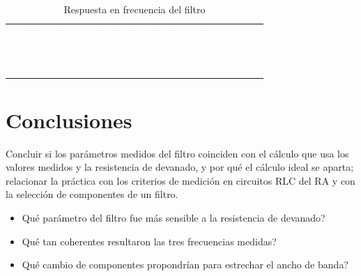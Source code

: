 \documentclass[12pt]{article}
\begin{document}
\begin{table}[H]
  \centering
  \caption{Respuesta en frecuencia del filtro}
  \label{tab:registro-2}
  \begin{tabularx}{\linewidth}{>{\raggedright\arraybackslash}X>{\raggedright\arraybackslash}X>{\raggedright\arraybackslash}X>{\raggedright\arraybackslash}X}
    \rowcolor{iubnavy} \textcolor{white}{\textbf{Frecuencia (kHz)}} & \textcolor{white}{\textbf{Vent (V)}} & \textcolor{white}{\textbf{Vsal (V)}} & \textcolor{white}{\textbf{Vsal/Vent}} \\
    \rule{0pt}{0.8cm} & & & \\
    \rowcolor{iubfondogris} \rule{0pt}{0.8cm} & & & \\
    \rule{0pt}{0.8cm} & & & \\
    \rowcolor{iubfondogris} \rule{0pt}{0.8cm} & & & \\
    \rule{0pt}{0.8cm} & & & \\
    \rowcolor{iubfondogris} \rule{0pt}{0.8cm} & & & \\
    \rule{0pt}{0.8cm} & & & \\
    \rowcolor{iubfondogris} \rule{0pt}{0.8cm} & & & \\
    \rule{0pt}{0.8cm} & & & \\
    \rowcolor{iubfondogris} \rule{0pt}{0.8cm} & & & \\
    \bottomrule
  \end{tabularx}
\end{table}

\section{Conclusiones}\label{sec:conclusiones}
Concluir si los parámetros medidos del filtro coinciden con el cálculo que usa los valores medidos y la resistencia de devanado, y por qué el cálculo ideal se aparta; relacionar la práctica con los criterios de medición en circuitos RLC del RA y con la selección de componentes de un filtro.
\lineablanco
\begin{itemize}
  \item \textquestiondown{}Qué parámetro del filtro fue más sensible a la resistencia de devanado?
  \item \textquestiondown{}Qué tan coherentes resultaron las tres frecuencias medidas?
  \item \textquestiondown{}Qué cambio de componentes propondrían para estrechar el ancho de banda?
\end{itemize}
\end{document}
